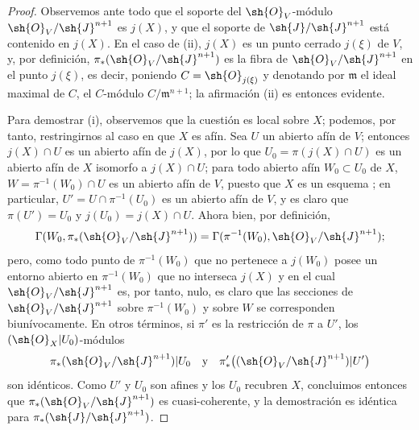 \documentclass[oneside,10pt]{amsart}
\newcommand{\oldpage}[2][]{\marginnote{\normalfont\footnotesize\textbf{#1}~|~#2}\ignorespaces}
\begin{document}
\begin{proof}
Observemos ante todo que el soporte del $\sh{O}_V$-módulo $\sh{O}_V/\sh{J}^{n+1}$ es $j(X)$, y que el soporte de $\sh{J}/\sh{J}^{n+1}$ está contenido en $j(X)$.
En el caso de (ii), $j(X)$ es un punto cerrado $j(\xi)$ de $V$,
\oldpage[II]{185}
y, por definición, $\pi_*(\sh{O}_V/\sh{J}^{n+1})$ es la fibra de $\sh{O}_V/\sh{J}^{n+1}$ en el punto $j(\xi)$, es decir, poniendo $C=\sh{O}_{j(\xi)}$ y denotando por $\mathfrak{m}$ el ideal maximal de $C$, el $C$-módulo $C/\mathfrak{m}^{n+1}$;
la afirmación (ii) es entonces evidente.

Para demostrar (i), observemos que la cuestión es local sobre $X$;
podemos, por tanto, restringirnos al caso en que $X$ es afín.
Sea $U$ un abierto afín de $V$;
entonces $j(X)\cap U$ es un abierto afín de $j(X)$, por lo que $U_0=\pi(j(X)\cap U)$ es un abierto afín de $X$ isomorfo a $j(X)\cap U$;
para todo abierto afín $W_0\subset U_0$ de $X$, $W=\pi^{-1}(W_0)\cap U$ es un abierto afín de $V$, puesto que $X$ es un esquema ;
en particular, $U'=U\cap\pi^{-1}(U_0)$ es un abierto afín de $V$, y es claro que $\pi(U')=U_0$ y $j(U_0)=j(X)\cap U$.
Ahora bien, por definición,
\[
  \Gamma(W_0,\pi_*(\sh{O}_V/\sh{J}^{n+1}))
  =\Gamma(\pi^{-1}(W_0),\sh{O}_V/\sh{J}^{n+1});
\]
pero, como todo punto de $\pi^{-1}(W_0)$ que no pertenece a $j(W_0)$ posee un entorno abierto en $\pi^{-1}(W_0)$ que no interseca $j(X)$ y en el cual $\sh{O}_V/\sh{J}^{n+1}$ es, por tanto, nulo, es claro que las secciones de $\sh{O}_V/\sh{J}^{n+1}$ sobre $\pi^{-1}(W_0)$ y sobre $W$ se corresponden biunívocamente.
En otros términos, si $\pi'$ es la restricción de $\pi$ a $U'$, los $(\sh{O}_X|U_0)$-módulos
\[
  \pi_*(\sh{O}_V/\sh{J}^{n+1})|U_0
  \quad\hbox{y}\quad
  \pi'_*\bigl((\sh{O}_V/\sh{J}^{n+1})|U'\bigr)
\]
son idénticos.
Como $U'$ y $U_0$ son afines y los $U_0$ recubren $X$, concluimos entonces  que $\pi_*(\sh{O}_V/\sh{J}^{n+1})$ es cuasi-coherente, y la demostración es idéntica para $\pi_*(\sh{J}/\sh{J}^{n+1})$.


\end{proof}
\end{document}
